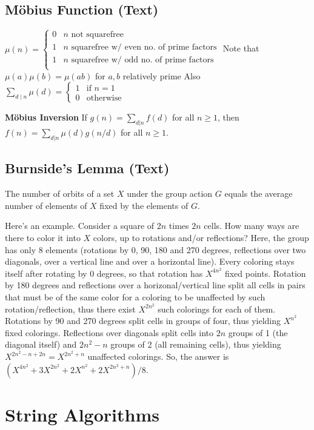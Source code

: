 \documentclass[12pt]{extarticle}
\begin{document}
\begin{multicols*}{2}
\subsection{M\"obius Function (Text)} %
$\mu(n) = \begin{cases}
0 & \text{$n$ not squarefree} \\
1 & \text{$n$ squarefree w/ even no. of prime factors} \\
1 & \text{$n$ squarefree w/ odd no. of prime factors} \\
\end{cases}$
Note that $\mu(a) \mu(b) = \mu(ab)$ for $a, b$ relatively prime
Also $\sum_{d \mid n} \mu(d) = \begin{cases} 1 & \text{if $n = 1$} \\
0 & \text{otherwise} \end{cases}$

\textbf{M\"obius Inversion}
If $g(n) = \sum_{d|n} f(d)$ for all $n \ge 1$, then
$f(n) = \sum_{d|n} \mu(d)g(n/d)$ for all $n \ge 1$.

\subsection{Burnside's Lemma (Text)} %
The number of orbits of a set $X$ under the group action $G$ equals the average
number of elements of $X$ fixed by the elements of $G$.

Here's an example. Consider a square of $2n$ times $2n$ cells. How many ways
are there to color it into $X$ colors, up to rotations and/or reflections?
Here, the group has only 8 elements (rotations by 0, 90, 180 and 270 degrees,
reflections over two diagonals, over a vertical line and over a horizontal
line). Every coloring stays itself after rotating by 0 degrees, so that
rotation has $X^{4n^2}$ fixed points. Rotation by 180 degrees and reflections
over a horizonal/vertical line split all cells in pairs that must be of the
same color for a coloring to be unaffected by such rotation/reflection, thus
there exist $X^{2n^2}$ such colorings for each of them. Rotations by 90 and 270
degrees split cells in groups of four, thus yielding $X^{n^2}$ fixed colorings.
Reflections over diagonals split cells into $2n$ groups of 1 (the diagonal
itself) and $2n^2-n$ groups of 2 (all remaining cells), thus yielding
$X^{2n^2-n+2n}=X^{2n^2+n}$ unaffected colorings.  So, the answer is
$(X^{4n^2}+3X^{2n^2}+2X^{n^2}+2X^{2n^2+n})/8$.

\section{String Algorithms}


\end{multicols*}
\end{document}
